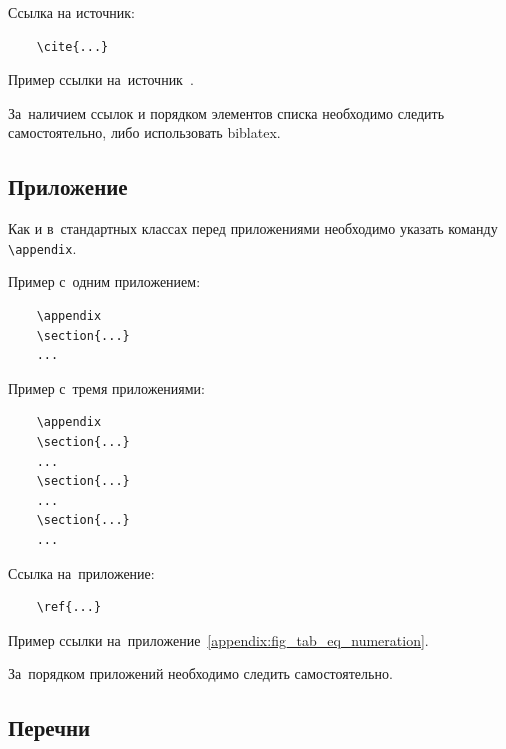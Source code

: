 \documentclass{SIBGU-state}
\begin{document}
Ссылка на источник:
\begin{verbatim}
	\cite{...}
\end{verbatim}

Пример ссылки на~источник~\cite{bib:recomendations}.

За~наличием ссылок и порядком элементов списка необходимо следить самостоятельно, либо использовать biblatex.


\subsection{Приложение}

Как и в~стандартных классах перед приложениями необходимо указать команду \verb"\appendix".

Пример с~одним приложением:
\begin{verbatim}
	\appendix
	\section{...}
	...
\end{verbatim}

Пример с~тремя приложениями:
\begin{verbatim}
	\appendix
	\section{...}
	...
	\section{...}
	...
	\section{...}
	...
\end{verbatim}

Ссылка на~приложение:
\begin{verbatim}
	\ref{...}
\end{verbatim}

Пример ссылки на~приложение~\ref{appendix:fig_tab_eq_numeration}.

За~порядком приложений необходимо следить самостоятельно.


\subsection{Перечни}


\subsubsection{}
\end{document}
